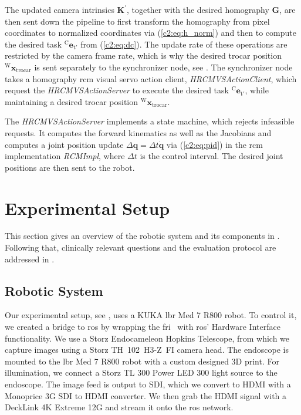 The updated camera intrinsics $\mathbf{K}^\prime$, together with the desired homography $\mathbf{G}$, are then sent down the pipeline to first transform the homography from pixel coordinates to normalized coordinates via (\eqref{c2:eq:h_norm}) and then to compute the desired task $^\text{C}\mathbf{e}_{\text{t}'}$ from (\eqref{c2:eq:dc}). The update rate of these operations are restricted by the camera frame rate, which is why the desired trocar position $^\text{W}\mathbf{x}_\text{trocar}$ is sent separately to the synchronizer node, see . The synchronizer node takes a homography \gls{rcm} visual servo action client, \textit{HRCMVSActionClient}, which request the \textit{HRCMVSActionServer} to execute the desired task $^\text{C}\mathbf{e}_{\text{t}'}$, while maintaining a desired trocar position $^\text{W}\mathbf{x}_\text{trocar}$. 

The \textit{HRCMVSActionServer} implements a state machine, which rejects infeasible requests. It computes the forward kinematics as well as the Jacobians and computes a joint position update $\Delta\mathbf{q}=\Delta t\dot{\mathbf{q}}$ via (\eqref{c2:eq:pid}) in the \gls{rcm} implementation \textit{RCMImpl}, where $\Delta t$ is the control interval. The desired joint positions are then sent to the robot.

\section{Experimental Setup}
\label{c2:sec:experimental_setup}

This section gives an overview of the robotic system and its components in . Following that, clinically relevant questions and the evaluation protocol are addressed in .

\subsection{Robotic System}
\label{c2:sec:robotic_system}

Our experimental setup, see , uses a KUKA \gls{lbr} Med 7 R800 robot. To control it, we created a bridge to \gls{ros} by wrapping the \gls{fri}~\cite{ref-fri} with \gls{ros}' Hardware Interface functionality. We use a Storz Endocameleon Hopkins Telescope, from which we capture images using a Storz TH~102~H3-Z~FI camera head. The endoscope is mounted to the \gls{lbr} Med 7 R800 robot with a custom designed 3D print. For illumination, we connect a Storz TL 300 Power LED 300 light source to the endoscope. The image feed is output to SDI, which we convert to HDMI with a Monoprice 3G SDI to HDMI converter. We then grab the HDMI signal with a DeckLink 4K Extreme 12G and stream it onto the \gls{ros} network.

